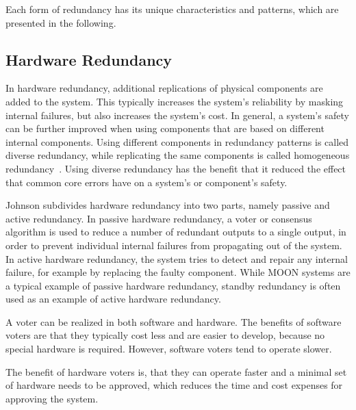 Each form of redundancy has its unique characteristics and patterns, which are presented in the following.

\subsection{Hardware Redundancy}
In hardware redundancy, additional replications of physical components are added to the system.
This typically increases the system's reliability by masking internal failures, but also increases the system's cost.
In general, a system's safety can be further improved when using components that are based on different internal components.
Using different components in redundancy patterns is called diverse redundancy, while replicating the same components is called homogeneous redundancy~\cite{HomogeneousRedundancyOuzineb}.
Using diverse redundancy has the benefit that it reduced the effect that common core errors have on a system's or component's safety.

Johnson subdivides hardware redundancy into two parts, namely passive and active redundancy.
In passive hardware redundancy, a voter or consensus algorithm is used to reduce a number of redundant outputs to a single output, in order to prevent individual internal failures from propagating out of the system.
In active hardware redundancy, the system tries to detect and repair any internal failure, for example by replacing the faulty component.
While \gls*{MOON} systems are a typical example of passive hardware redundancy, standby redundancy is often used as an example of active hardware redundancy.

A voter can be realized in both software and hardware.
The benefits of software voters are that they typically cost less and are easier to develop, because no special hardware is required.
However, software voters tend to operate slower.

The benefit of hardware voters is, that they can operate faster and a minimal set of hardware needs to be approved, which reduces the time and cost expenses for approving the system.

